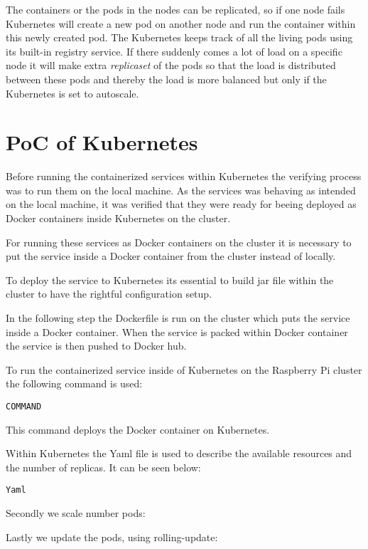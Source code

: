 The containers or the pods in the nodes can be replicated, so if one node fails Kubernetes will create a new pod on another node and run the container within this newly created pod. The Kubernetes keeps track of all the living pods using its built-in registry service.  
If there suddenly comes a lot of load on a specific node it will make extra \emph{replicaset} of the pods so that the load is distributed between these pods and thereby the load is more balanced but only if the Kubernetes is set to autoscale. 

\section{PoC of Kubernetes}
Before running the containerized services within Kubernetes the verifying process was to run them on the local machine. As the services was behaving as intended on the local machine, it was verified that they were ready for beeing deployed as Docker containers inside Kubernetes on the cluster. 

For running these services as Docker containers on the cluster it is necessary to put the service inside a Docker container from the cluster instead of locally.

To deploy the service to Kubernetes its essential to build jar file within the cluster to have the rightful configuration setup.

In the following step the Dockerfile is run on the cluster which puts the service inside a Docker container. When the service is packed within Docker container the service is then pushed to Docker hub.   

To run the containerized service inside of Kubernetes on the Raspberry Pi cluster the following command is used:

\begin{lstlisting}
COMMAND 
\end{lstlisting}

This command deploys the Docker container on Kubernetes. 

Within Kubernetes the Yaml file is used to describe the available resources and the number of replicas. It can be seen below:

\begin{lstlisting}
Yaml
\end{lstlisting}


Secondly we scale number pods:

Lastly we update the pods, using rolling-update:






